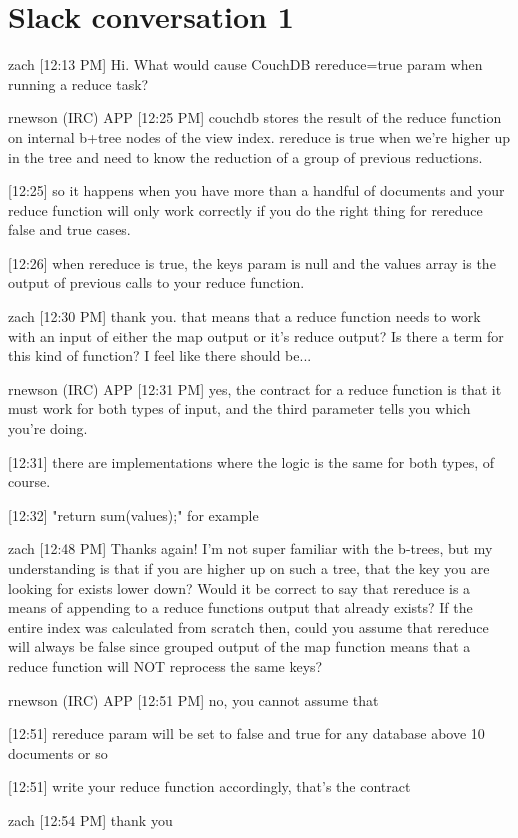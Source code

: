\section{Slack conversation 1}
\label{appendix:slack1}

zach [12:13 PM]
Hi. What would cause CouchDB rereduce=true param when running a reduce task?

rnewson (IRC) APP [12:25 PM]
couchdb stores the result of the reduce function on internal b+tree nodes of the view index. rereduce is true when we're higher up in the tree and need to know the reduction of a group of previous reductions.

[12:25]
so it happens when you have more than a handful of documents and your reduce function will only work correctly if you do the right thing for rereduce false and true cases.

[12:26]
when rereduce is true, the keys param is null and the values array is the output of previous calls to your reduce function.

zach [12:30 PM]
thank you. that means that a reduce function needs to work with an input of either the map output or it's reduce output? Is there a term for this kind of function? I feel like there should be...

rnewson (IRC) APP [12:31 PM]
yes, the contract for a reduce function is that it must work for both types of input, and the third parameter tells you which you're doing.

[12:31]
there are implementations where the logic is the same for both types, of course.

[12:32]
"return sum(values);" for example

zach [12:48 PM]
Thanks again! I'm not super familiar with the b-trees, but my understanding is that if you are higher up on such a tree, that the key you are looking for exists lower down? Would it be correct to say that rereduce is a means of appending to a reduce functions output that already exists? If the entire index was calculated from scratch then, could you assume that rereduce will always be false since grouped output of the map function means that a reduce function will NOT reprocess the same keys?

rnewson (IRC) APP [12:51 PM]
no, you cannot assume that

    [12:51]
rereduce param will be set to false and true for any database above 10 documents or so

    [12:51]
write your reduce function accordingly, that's the contract

zach [12:54 PM]
thank you